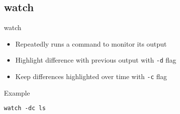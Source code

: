 \subsection{watch}

\begin{frame}[fragile]{watch}
  \begin{itemize}
    \pause \item Repeatedly runs a command to monitor its output
    \pause \item Highlight difference with previous output with \texttt{-d} flag
    \pause \item Keep differences highlighted over time with \texttt{-c} flag
  \end{itemize}
  \pause

  \begin{exampleblock}{Example}
    \begin{lstlisting}[showstringspaces=false]
watch -dc ls
    \end{lstlisting}
  \end{exampleblock}
\end{frame}
